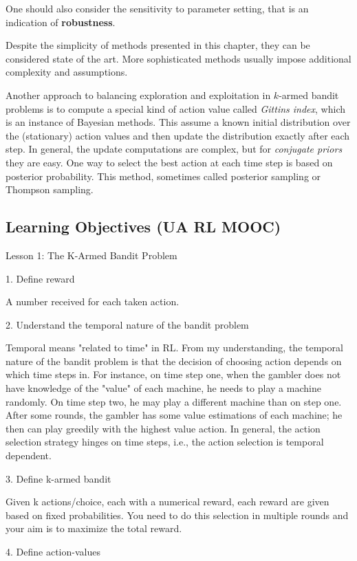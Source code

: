 \documentclass[lang=en,mode=geye,device=normal,color=blue,14pt]{elegantnote}
\DeclareMathOperator*{\1}{\mathbbm{1}}
\begin{document}
One should also consider the sensitivity to parameter setting, that is an indication of \textbf{robustness}.

Despite the simplicity of methods presented in this chapter, they can be considered state of the art. More sophisticated methods usually impose additional complexity and assumptions.

Another approach to balancing exploration and exploitation in $k$-armed bandit problems is to compute a special kind of action value called \textit{Gittins index}, which is an instance of Bayesian methods. This assume a known initial distribution over the (stationary) action values and then update the distribution exactly after each step.
In general, the update computations are complex, but for \textit{conjugate priors} they are easy.
One way to select the best action at each time step is based on posterior probability.
This method, sometimes called posterior sampling or Thompson sampling.

\newpage
\subsection{Learning Objectives (UA RL MOOC)}

Lesson 1: The K-Armed Bandit Problem

1. Define reward

A number received for each taken action.

2. Understand the temporal nature of the bandit problem

Temporal means "related to time" in RL. From my understanding, the temporal nature of the bandit problem is that the decision of choosing action depends on which time steps in.
For instance, on time step one, when the gambler does not have knowledge of the "value" of each machine, he needs to play a machine randomly. On time step two, he may play a different machine than on step one. After some rounds, the gambler has some value estimations of each machine; he then can play greedily with the highest value action.
In general, the action selection strategy hinges on time steps, i.e., the action selection is temporal dependent.

3. Define k-armed bandit

Given k actions/choice, each with a numerical reward, each reward are given based on fixed probabilities. You need to do this selection in multiple rounds and your aim is to maximize the total reward.

4. Define action-values
\end{document}
